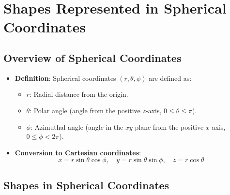 \documentclass{report}
\begin{document}
\section{Shapes Represented in Spherical Coordinates}

\subsection{Overview of Spherical Coordinates}
\begin{itemize}
    \item \textbf{Definition}: Spherical coordinates \((r, \theta, \phi)\) are defined as:
    \begin{itemize}
        \item \(r\): Radial distance from the origin.
        \item \(\theta\): Polar angle (angle from the positive \(z\)-axis, \(0 \leq \theta \leq \pi\)).
        \item \(\phi\): Azimuthal angle (angle in the \(xy\)-plane from the positive \(x\)-axis, \(0 \leq \phi < 2\pi\)).
    \end{itemize}
    \item \textbf{Conversion to Cartesian coordinates}:
    \[
    x = r \sin\theta \cos\phi, \quad y = r \sin\theta \sin\phi, \quad z = r \cos\theta
    \]
\end{itemize}

\subsection{Shapes in Spherical Coordinates}
\end{document}
